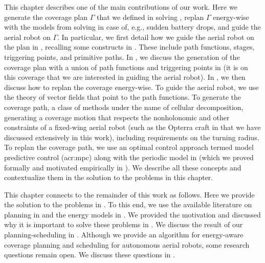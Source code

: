 This chapter describes one of the main contributions of our work. Here we generate the coverage plan $\Gamma$ that we defined in  solving , replan $\Gamma$ energy-wise with the models from  solving  in case of, e.g., sudden battery drops, and guide the aerial robot on $\Gamma$. In particular, we first detail how we guide the aerial robot on the plan in , recalling some constructs in . These include path functions, stages, triggering points, and primitive paths. In , we discuss the generation of the coverage plan with a union of path functions and triggering points in  (it is on this coverage that we are interested in guiding the aerial robot). In , we then discuss how to replan the coverage energy-wise. To guide the aerial robot, we use the theory of vector fields that point to the path functions. To generate the coverage path, a class of methods under the name of cellular decomposition, generating a coverage motion that respects the nonholonomic and other constraints of a fixed-wing aerial robot (such as the Opterra craft in  that we have discussed extensively in this work), including requirements on the turning radius. To replan the coverage path, we use an optimal control approach termed model predictive control (\Gls{acr:mpc}) along with the periodic model in  (which we proved formally and motivated empirically in ). We describe all these concepts and contextualize them in the solution to the problems in this chapter. 

This chapter connects to the remainder of this work as follows. Here we provide the solution to the problems in . To this end, we use the available literature on planning in  and the energy models in . We provided the motivation and discussed why it is important to solve these problems in . We discuss the result of our planning-scheduling in . Although we provide an algorithm for energy-aware coverage planning and scheduling for autonomous aerial robots, some research questions remain open. We discuss these questions in .



